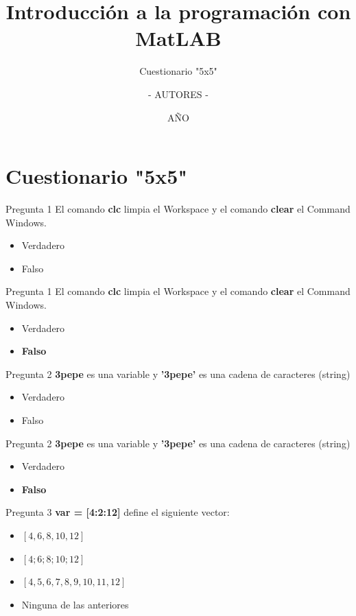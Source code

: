 \documentclass{bredelebeamer}
\title[Programación en MatLAB]{Introducción a la programación con MatLAB}
\subtitle{Cuestionario "5x5"}
\author{- AUTORES - \inst{1}}
\institute[UNIVERSIDAD]
{
  \inst{1}%
  - NOMBRE UNIVERSIDAD - 
  }
\date{AÑO}
\begin{document}
\begin{frame}
  \titlepage 
\end{frame}




\section{Cuestionario "5x5"}

\begin{frame}{Pregunta 1}
El comando \textbf{clc} limpia el Workspace y el comando \textbf{clear} el Command Windows.
\begin{itemize}
\item Verdadero
\item Falso
\end{itemize}
\end{frame}

\begin{frame}{Pregunta 1}
El comando \textbf{clc} limpia el Workspace y el comando \textbf{clear} el Command Windows.
\begin{itemize}
\item Verdadero
\item \textbf{Falso}
\end{itemize}
\end{frame}

\begin{frame}{Pregunta 2}
\textbf{3pepe} es una variable y \textbf{'3pepe'} es una cadena de caracteres (string)
\begin{itemize}
\item Verdadero
\item Falso
\end{itemize}
\end{frame}

\begin{frame}{Pregunta 2}
\textbf{3pepe} es una variable y \textbf{'3pepe'} es una cadena de caracteres (string)
\begin{itemize}
\item Verdadero
\item \textbf{Falso}
\end{itemize}
\end{frame}

\begin{frame}{Pregunta 3}
\textbf{var = [4:2:12]} define el siguiente vector:
\begin{itemize}
\item $[4, 6, 8, 10, 12]$
\item $[4; 6; 8; 10; 12]$
\item $[4,5,6,7,8,9,10,11,12]$
\item Ninguna de las anteriores
\end{itemize}
\end{frame}
\end{document}
